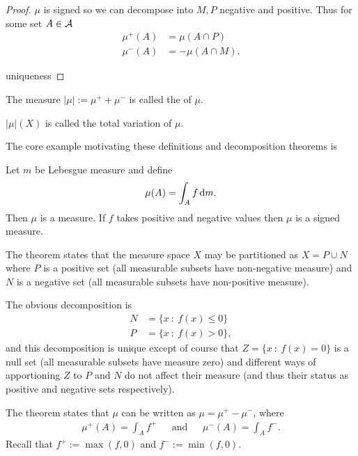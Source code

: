 \begin{proof}
  $\mu$ is signed so we can decompose into $M, P$ negative and positive. Thus for some set $A \in \mathcal A$
  \begin{align*}
    \mu^+(A) &= \mu(A \cap P) \\
    \mu^-(A) &= -\mu(A \cap M).
  \end{align*}

   uniqueness
\end{proof}

\begin{definition}
  The measure $|\mu| := \mu^+ + \mu^-$ is called the  of $\mu$.

  $|\mu|(X)$ is called the total variation of $\mu$.
\end{definition}

The core example motivating these definitions and decomposition theorems is

\begin{example}
  Let $m$ be Lebesgue measure and define
  \begin{align*}
    \mu(A) = \int_A f \d m.
  \end{align*}
  Then $\mu$ is a measure. If $f$ takes positive and negative values then $\mu$ is a signed measure.

  The  theorem states that the measure space $X$ may be partitioned as $X = P \cup N$ where
  $P$ is a positive set (all measurable subsets have non-negative measure) and $N$ is a negative set (all
  measurable subsets have non-positive measure).

  The obvious decomposition is
  \begin{align*}
    N &= \{x ~:~ f(x) \leq 0\} \\
    P &= \{x ~:~ f(x) > 0\},
  \end{align*}
  and this decomposition is unique except of course that $Z = \{x ~:~ f(x) = 0\}$ is a null set (all measurable
  subsets have measure zero) and different ways of apportioning $Z$ to $P$ and $N$ do not affect their measure
  (and thus their status as positive and negative sets respectively).

  The  theorem states that $\mu$ can be written as $\mu = \mu^+ - \mu^-$, where
  \begin{align*}
    \mu^+(A) = \int_A f^+ ~~~~~~~ \text{and} ~~~~~~~ \mu^-(A) = \int_A f^-.
  \end{align*}
  Recall that $f^+ := \max(f, 0)$ and $f^- := \min(f, 0)$.
\end{example}

